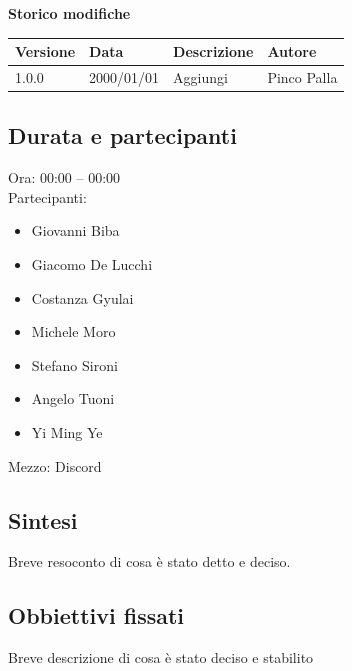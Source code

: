 \documentclass[a4paper, 11pt]{article}
\begin{document}
\vspace{0.4cm}

\textbf{Storico modifiche}

\vspace{-0.2cm}
\noindent
\renewcommand{\arraystretch}{1.3}
\begin{tabularx}{\textwidth}{|X|X|X|X|}
    \hline
    \rowcolor{gray!35}
    Versione & Data & Descrizione & Autore \\
    \hline
    1.0.0 & 2000/01/01 & Aggiungi & Pinco Palla \\
    \hline
\end{tabularx}

\newpage


\setcounter{section}{2}

\subsection{Durata e partecipanti}
Ora: 00:00 – 00:00 \\
Partecipanti:
\begin{itemize}\setlength\itemsep{0em}
    \item Giovanni Biba
    \item Giacomo De Lucchi
    \item Costanza Gyulai
    \item Michele Moro
    \item Stefano Sironi
    \item Angelo Tuoni
    \item Yi Ming Ye
\end{itemize}
Mezzo: Discord

\vspace{0.4cm}

\subsection{Sintesi}
Breve resoconto di cosa è stato detto e deciso.

\vspace{0.4cm}

\subsection{Obbiettivi fissati}
Breve descrizione di cosa è stato deciso e stabilito
\end{document}
